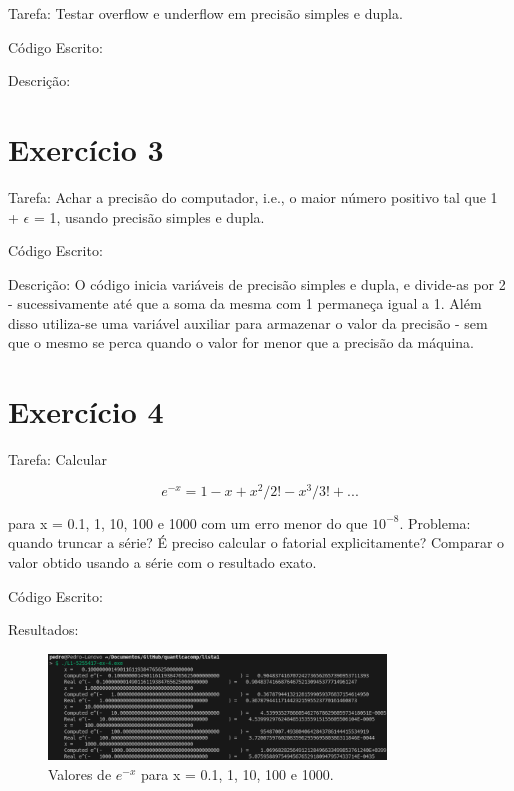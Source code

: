 \documentclass[12pt, a4paper]{article} %
\begin{document}
Tarefa: Testar overflow e underflow em precis\~ao simples e dupla.

C\'odigo Escrito:


Descri\c{c}\~ao:

\section{Exerc\'icio 3}

Tarefa: Achar a precis\~ao  do computador, i.e., o maior n\'umero positivo  tal que
1 + $\epsilon$ = 1, usando precis\~ao simples e dupla.

C\'odigo Escrito:


Descri\c{c}\~ao: O c\'odigo inicia vari\'aveis de precis\~ao simples e dupla, e divide-as por 2 - sucessivamente até que a soma da mesma com 1 permane\c{c}a igual a 1. Al\'em disso utiliza-se uma vari\'avel auxiliar para armazenar o valor da precis\~ao - sem que o mesmo se perca quando o valor for menor que a precis\~ao da m\'aquina.

\section{Exerc\'icio 4}

Tarefa: Calcular

\begin{equation} e^{-x} = 1 - x + x^2/2! - x^3/3! + ... \end{equation}

para x = 0.1, 1, 10, 100 e 1000 com um erro menor do que $10^{-8}$. Problema: quando truncar a s\'erie? \'E preciso calcular o fatorial explicitamente? Comparar o valor obtido usando a s\'erie com o resultado exato.

C\'odigo Escrito:


Resultados:
\begin{figure}[H]
    \centering
    \includegraphics[width=0.8\textwidth]{../images/results-ex4.png}
    \caption{Valores de $e^{-x}$ para x = 0.1, 1, 10, 100 e 1000.}
\end{figure}
\end{document}
